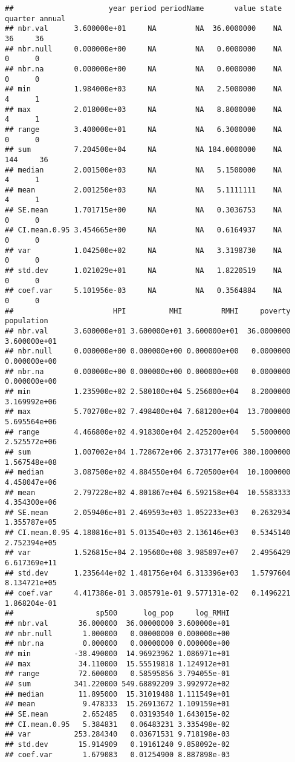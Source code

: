 \documentclass[
]{article}
\begin{document}
\begin{verbatim}
##                      year period periodName       value state quarter annual
## nbr.val      3.600000e+01     NA         NA  36.0000000    NA      36     36
## nbr.null     0.000000e+00     NA         NA   0.0000000    NA       0      0
## nbr.na       0.000000e+00     NA         NA   0.0000000    NA       0      0
## min          1.984000e+03     NA         NA   2.5000000    NA       4      1
## max          2.018000e+03     NA         NA   8.8000000    NA       4      1
## range        3.400000e+01     NA         NA   6.3000000    NA       0      0
## sum          7.204500e+04     NA         NA 184.0000000    NA     144     36
## median       2.001500e+03     NA         NA   5.1500000    NA       4      1
## mean         2.001250e+03     NA         NA   5.1111111    NA       4      1
## SE.mean      1.701715e+00     NA         NA   0.3036753    NA       0      0
## CI.mean.0.95 3.454665e+00     NA         NA   0.6164937    NA       0      0
## var          1.042500e+02     NA         NA   3.3198730    NA       0      0
## std.dev      1.021029e+01     NA         NA   1.8220519    NA       0      0
## coef.var     5.101956e-03     NA         NA   0.3564884    NA       0      0
##                       HPI          MHI         RMHI     poverty   population
## nbr.val      3.600000e+01 3.600000e+01 3.600000e+01  36.0000000 3.600000e+01
## nbr.null     0.000000e+00 0.000000e+00 0.000000e+00   0.0000000 0.000000e+00
## nbr.na       0.000000e+00 0.000000e+00 0.000000e+00   0.0000000 0.000000e+00
## min          1.235900e+02 2.580100e+04 5.256000e+04   8.2000000 3.169992e+06
## max          5.702700e+02 7.498400e+04 7.681200e+04  13.7000000 5.695564e+06
## range        4.466800e+02 4.918300e+04 2.425200e+04   5.5000000 2.525572e+06
## sum          1.007002e+04 1.728672e+06 2.373177e+06 380.1000000 1.567548e+08
## median       3.087500e+02 4.884550e+04 6.720500e+04  10.1000000 4.458047e+06
## mean         2.797228e+02 4.801867e+04 6.592158e+04  10.5583333 4.354300e+06
## SE.mean      2.059406e+01 2.469593e+03 1.052233e+03   0.2632934 1.355787e+05
## CI.mean.0.95 4.180816e+01 5.013540e+03 2.136146e+03   0.5345140 2.752394e+05
## var          1.526815e+04 2.195600e+08 3.985897e+07   2.4956429 6.617369e+11
## std.dev      1.235644e+02 1.481756e+04 6.313396e+03   1.5797604 8.134721e+05
## coef.var     4.417386e-01 3.085791e-01 9.577131e-02   0.1496221 1.868204e-01
##                   sp500      log_pop     log_RMHI
## nbr.val       36.000000  36.00000000 3.600000e+01
## nbr.null       1.000000   0.00000000 0.000000e+00
## nbr.na         0.000000   0.00000000 0.000000e+00
## min          -38.490000  14.96923962 1.086971e+01
## max           34.110000  15.55519818 1.124912e+01
## range         72.600000   0.58595856 3.794055e-01
## sum          341.220000 549.68892209 3.992972e+02
## median        11.895000  15.31019488 1.111549e+01
## mean           9.478333  15.26913672 1.109159e+01
## SE.mean        2.652485   0.03193540 1.643015e-02
## CI.mean.0.95   5.384831   0.06483231 3.335498e-02
## var          253.284340   0.03671531 9.718198e-03
## std.dev       15.914909   0.19161240 9.858092e-02
## coef.var       1.679083   0.01254900 8.887898e-03
\end{verbatim}
\end{document}

